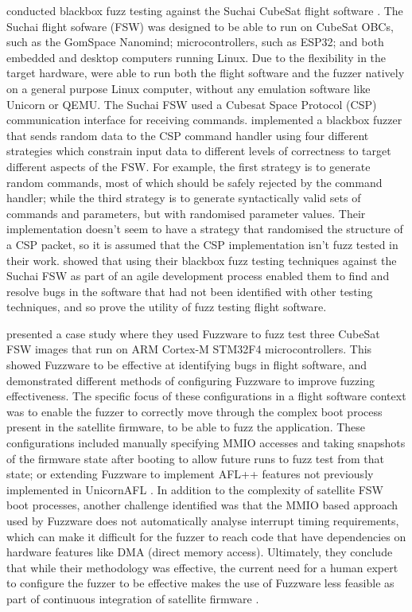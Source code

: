 \documentclass[../report.tex]{subfiles}
\begin{document}
\citet{Gutierrez_2021} conducted blackbox fuzz testing against the Suchai
CubeSat flight software \citep{Suchai_FSW}. The Suchai flight sofware (FSW) was
designed to be able to run on CubeSat OBCs, such as the GomSpace Nanomind;
microcontrollers, such as ESP32; and both embedded and desktop computers running
Linux. Due to the flexibility in the target hardware, \citet{Gutierrez_2021}
were able to run both the flight software and the fuzzer natively on a general
purpose Linux computer, without any emulation software like Unicorn or QEMU.
The Suchai FSW used a Cubesat Space Protocol (CSP) communication interface for
receiving commands. \citet{Gutierrez_2021} implemented a blackbox fuzzer that
sends random data to the CSP command handler using four different strategies
which constrain input data to different levels of correctness to target
different aspects of the FSW. For example, the first strategy is to generate
random commands, most of which should be safely rejected by the command
handler; while the third strategy is to generate syntactically valid sets of
commands and parameters, but with randomised parameter values. Their
implementation doesn't seem to have a strategy that randomised the structure of
a CSP packet, so it is assumed that the CSP implementation isn't fuzz tested in
their work.
\citet{Gutierrez_2021} showed that using their blackbox fuzz testing
techniques against the Suchai FSW as part of an agile development process
enabled them to find and resolve bugs in the software that had not been
identified with other testing techniques, and so prove the utility of fuzz
testing flight software.

\citet{Scharnowski_2023} presented a case study where they used Fuzzware
\citep{Fuzzware_2022} to fuzz test three CubeSat FSW images that run on ARM
Cortex-M STM32F4 microcontrollers. This showed Fuzzware to be effective at
identifying bugs in flight software, and demonstrated different methods of
configuring Fuzzware to improve fuzzing effectiveness. The specific focus of
these configurations in a flight software context was to enable the fuzzer to
correctly move through the complex boot process present in the satellite
firmware, to be able to fuzz the application. These configurations included
manually specifying MMIO accesses and %
taking snapshots of the firmware state after booting to allow future runs to
fuzz test from that state; or extending Fuzzware to implement AFL++ features
not previously implemented in UnicornAFL \citep{Scharnowski_2023}. In addition
to the complexity of satellite FSW boot processes, another challenge identified
was that the MMIO based approach used by Fuzzware does not automatically analyse
interrupt timing requirements, which can make it difficult for the fuzzer to
reach code that have dependencies on hardware features like DMA (direct memory
access). Ultimately, they conclude that while their methodology was effective,
the current need for a human expert to configure the fuzzer to be effective
makes the use of Fuzzware less feasible as part of continuous integration of
satellite firmware \citep{Scharnowski_2023}.
\end{document}
